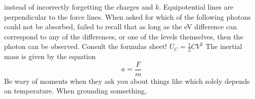 instead of incorrectly forgetting the charges and $k$.\markdownRendererInterblockSeparator
{}\markdownRendererUlBeginTight
\markdownRendererUlItem Equipotential lines are perpendicular to the force lines.\markdownRendererUlItemEnd 
\markdownRendererUlItem When asked for which of the following photons could not be absorbed, failed to recall that as long as the eV difference can correspond to any of the differences, or one of the levels themselves, then the photon can be observed.\markdownRendererUlItemEnd 
\markdownRendererUlItem Consult the formulas sheet! $U_C = \frac{1}{2}CV^2$\markdownRendererUlItemEnd 
\markdownRendererUlItem The inertial mass is given by the equation $$a = \frac{F}{m}$$\markdownRendererUlItemEnd 
\markdownRendererUlItem Be wary of moments when they ask you about things like  which solely depends on temperature.\markdownRendererUlItemEnd 
\markdownRendererUlItem When grounding somsething,\markdownRendererUlItemEnd 
\markdownRendererUlEndTight \relax